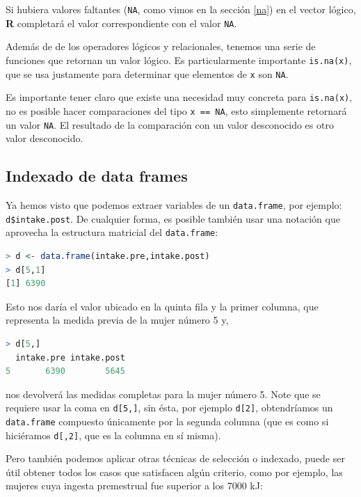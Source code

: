 Si hubiera valores faltantes (\texttt{NA}, como vimos en la sección \ref{na})
en el vector lógico, \textbf{R} completará el valor correspondiente con el
valor \texttt{NA}.

Además de de los operadores lógicos y relacionales, tenemos una serie de
funciones que retornan un valor lógico. Es particularmente importante
\texttt{is.na(x)}, que se usa justamente para determinar que elementos de
\texttt{x} son \texttt{NA}.

Es importante tener claro que existe una necesidad muy concreta para
\texttt{is.na(x)}, no es posible hacer comparaciones del tipo \texttt{x == NA},
esto simplemente retornará un valor \texttt{NA}. El resultado de la comparación
con un valor desconocido es otro valor desconocido.

\subsection{Indexado de data frames}

Ya hemos visto que podemos extraer variables de un \texttt{data.frame},
por ejemplo: \texttt{d\$intake.post}. De cualquier forma, es
posible también usar una notación que aprovecha la estructura matricial del
\texttt{data.frame}:

\begin{lstlisting}[language=R]
> d <- data.frame(intake.pre,intake.post)
> d[5,1]
[1] 6390
\end{lstlisting}

Esto nos daría el valor ubicado en la quinta fila y la primer columna, que
representa la medida previa de la mujer número 5 y,

\begin{lstlisting}[language=R]
> d[5,]
  intake.pre intake.post
5       6390        5645
\end{lstlisting}

nos devolverá las medidas completas para la mujer número 5. Note que se
requiere usar la coma en \texttt{d[5,]}, sin ésta, por ejemplo \texttt{d[2]},
obtendríamos un \texttt{data.frame} compuesto únicamente por la segunda columna
(que es como si hiciéramos \texttt{d[,2]}, que es la columna en sí misma).

Pero también podemos aplicar otras técnicas de selección o indexado, puede ser
útil obtener todos los casos que satisfacen algún criterio, como por ejemplo,
las mujeres cuya ingesta premestrual fue superior a los 7000 kJ:

